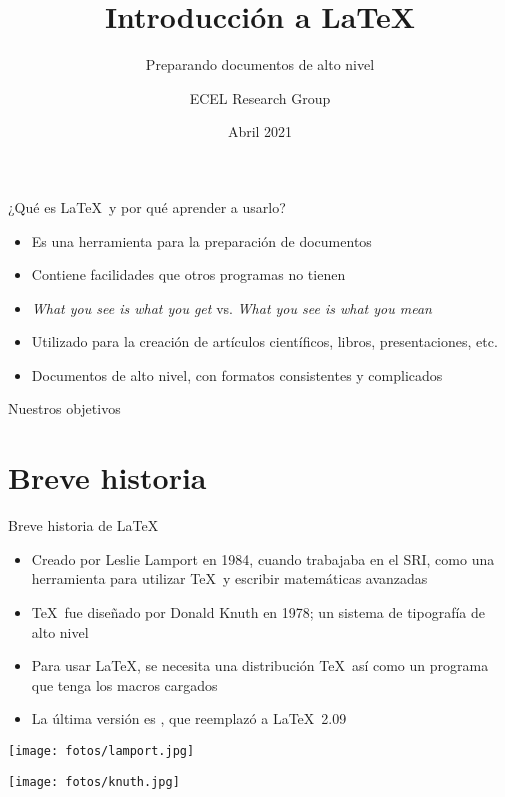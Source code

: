 \documentclass{beamer}
\title{Introducción a \LaTeX}
\subtitle{Preparando documentos de alto nivel}
\author{ECEL Research Group}
\date{Abril 2021}
\begin{document}
\begin{frame}
 \maketitle   
\end{frame}
\begin{frame}{¿Qué es \LaTeX \ y por qué aprender a usarlo?}
\begin{itemize}
\item Es una herramienta para la preparación de documentos
\item Contiene facilidades que otros programas no tienen
\item \textit{What you see is what you get} vs. \textit{What you see is what you mean}
\item Utilizado para la creación de artículos científicos, libros, presentaciones, etc. 
\item Documentos de alto nivel, con formatos consistentes y complicados
\end{itemize}
\end{frame}
\begin{frame}{Nuestros objetivos}
 \tableofcontents
\end{frame}
\section{Breve historia}
\begin{frame}{Breve historia de \LaTeX}
\begin{minipage}[c]{0.55\textwidth}
 \begin{itemize}
     \item Creado por Leslie Lamport en 1984, cuando trabajaba en el SRI, como una herramienta para utilizar \TeX \ y escribir matemáticas avanzadas
   \item \TeX \  fue diseñado por Donald Knuth en 1978; un sistema de tipografía de alto nivel
     \item Para usar \LaTeX, se necesita una distribución \TeX  \ así como un programa que tenga los macros cargados
     \item La última versión es \LaTeXe, que reemplazó a \LaTeX \ 2.09
      \end{itemize}
     \end{minipage}
     \hfill
     \begin{minipage}[c]{0.4\textwidth}
     \centering
      \texttt{[image: fotos/lamport.jpg]}
      \vspace{1cm}
      
           \texttt{[image: fotos/knuth.jpg]}
      \end{minipage}
\end{frame}
\end{document}
